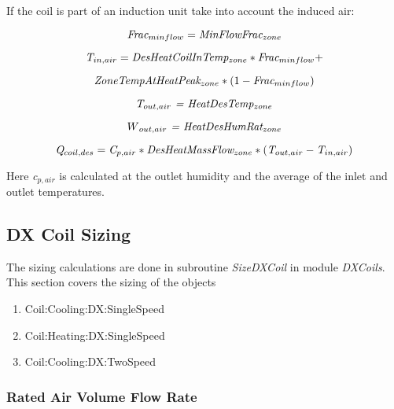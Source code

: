 If the coil is part of an induction unit take into account the induced air:

\begin{equation}
\emph{Frac\(_{minflow}\)} = \emph{MinFlowFrac\(_{zone}\)}
\end{equation}

\begin{equation}
\emph{T\(_{in,air}\)} = \emph{DesHeatCoilInTemp\(_{zone}\)} * \emph{Frac\(_{minflow}\)} +
\end{equation}

\begin{equation}
\emph{ZoneTempAtHeatPeak\(_{zone}\)} *(1- \emph{Frac\(_{minflow}\)})
\end{equation}

\begin{equation}
\emph{T\(_{out,air}\) = HeatDesTemp\(_{zone}\)}
\end{equation}

\begin{equation}
W\emph{\(_{out,air}\) = HeatDesHumRat\(_{zone}\)}
\end{equation}

\begin{equation}
\emph{Q\(_{coil,des}\)} = \emph{C\(_{p,air}\)} * \emph{DesHeatMassFlow\(_{zone}\)} *(\emph{T\(_{out,air}\)}-\emph{T\(_{in,air}\)})
\end{equation}

Here \emph{c\(_{p,air}\)} is calculated at the outlet humidity and the average of the inlet and outlet temperatures.

\subsection{DX Coil Sizing}\label{dx-coil-sizing}

The sizing calculations are done in subroutine \emph{SizeDXCoil} in module \emph{DXCoils}. This section covers the sizing of the objects

\begin{enumerate}
\def\labelenumi{\arabic{enumi}.}
\item
  Coil:Cooling:DX:SingleSpeed
\item
  Coil:Heating:DX:SingleSpeed
\item
  Coil:Cooling:DX:TwoSpeed
\end{enumerate}

\subsubsection{Rated Air Volume Flow Rate}\label{rated-air-volume-flow-rate}

